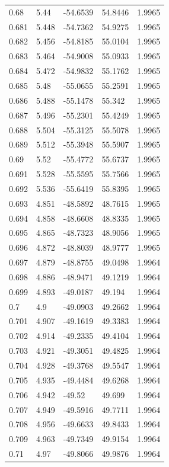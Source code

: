 \begin{tabular}{lllll}
0.68 & 5.44 & -54.6539 & 54.8446 & 1.9965 \\
0.681 & 5.448 & -54.7362 & 54.9275 & 1.9965 \\
0.682 & 5.456 & -54.8185 & 55.0104 & 1.9965 \\
0.683 & 5.464 & -54.9008 & 55.0933 & 1.9965 \\
0.684 & 5.472 & -54.9832 & 55.1762 & 1.9965 \\
0.685 & 5.48 & -55.0655 & 55.2591 & 1.9965 \\
0.686 & 5.488 & -55.1478 & 55.342 & 1.9965 \\
0.687 & 5.496 & -55.2301 & 55.4249 & 1.9965 \\
0.688 & 5.504 & -55.3125 & 55.5078 & 1.9965 \\
0.689 & 5.512 & -55.3948 & 55.5907 & 1.9965 \\
0.69 & 5.52 & -55.4772 & 55.6737 & 1.9965 \\
0.691 & 5.528 & -55.5595 & 55.7566 & 1.9965 \\
0.692 & 5.536 & -55.6419 & 55.8395 & 1.9965 \\
0.693 & 4.851 & -48.5892 & 48.7615 & 1.9965 \\
0.694 & 4.858 & -48.6608 & 48.8335 & 1.9965 \\
0.695 & 4.865 & -48.7323 & 48.9056 & 1.9965 \\
0.696 & 4.872 & -48.8039 & 48.9777 & 1.9965 \\
0.697 & 4.879 & -48.8755 & 49.0498 & 1.9964 \\
0.698 & 4.886 & -48.9471 & 49.1219 & 1.9964 \\
0.699 & 4.893 & -49.0187 & 49.194 & 1.9964 \\
0.7 & 4.9 & -49.0903 & 49.2662 & 1.9964 \\
0.701 & 4.907 & -49.1619 & 49.3383 & 1.9964 \\
0.702 & 4.914 & -49.2335 & 49.4104 & 1.9964 \\
0.703 & 4.921 & -49.3051 & 49.4825 & 1.9964 \\
0.704 & 4.928 & -49.3768 & 49.5547 & 1.9964 \\
0.705 & 4.935 & -49.4484 & 49.6268 & 1.9964 \\
0.706 & 4.942 & -49.52 & 49.699 & 1.9964 \\
0.707 & 4.949 & -49.5916 & 49.7711 & 1.9964 \\
0.708 & 4.956 & -49.6633 & 49.8433 & 1.9964 \\
0.709 & 4.963 & -49.7349 & 49.9154 & 1.9964 \\
0.71 & 4.97 & -49.8066 & 49.9876 & 1.9964 \\

\end{tabular}
